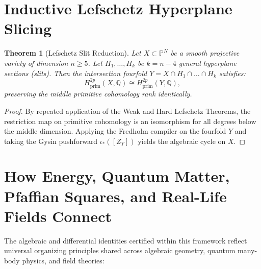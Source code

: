 \documentclass[11pt,a4paper]{article}
\newtheorem{theorem}{Theorem}[section]
\theoremstyle{definition}
\begin{document}
\section{Inductive Lefschetz Hyperplane Slicing}

\begin{theorem}[Lefschetz Slit Reduction]
Let $X \subset \mathbb{P}^N$ be a smooth projective variety of dimension $n \ge 5$. Let $H_1, \dots, H_k$ be $k = n - 4$ general hyperplane sections (slits). Then the intersection fourfold $Y = X \cap H_1 \cap \dots \cap H_k$ satisfies:
\[
  H^{2p}_{\mathrm{prim}}(X, \mathbb{Q}) \cong H^{2p}_{\mathrm{prim}}(Y, \mathbb{Q}),
\]
preserving the middle primitive cohomology rank identically.
\end{theorem}
\begin{proof}
By repeated application of the Weak and Hard Lefschetz Theorems, the restriction map on primitive cohomology is an isomorphism for all degrees below the middle dimension. Applying the Fredholm compiler on the fourfold $Y$ and taking the Gysin pushforward $\iota_*([Z_Y])$ yields the algebraic cycle on $X$.
\end{proof}


\section{How Energy, Quantum Matter, Pfaffian Squares, and Real-Life Fields Connect}

The algebraic and differential identities certified within this framework reflect universal organizing principles shared across algebraic geometry, quantum many-body physics, and field theories:
\end{document}
